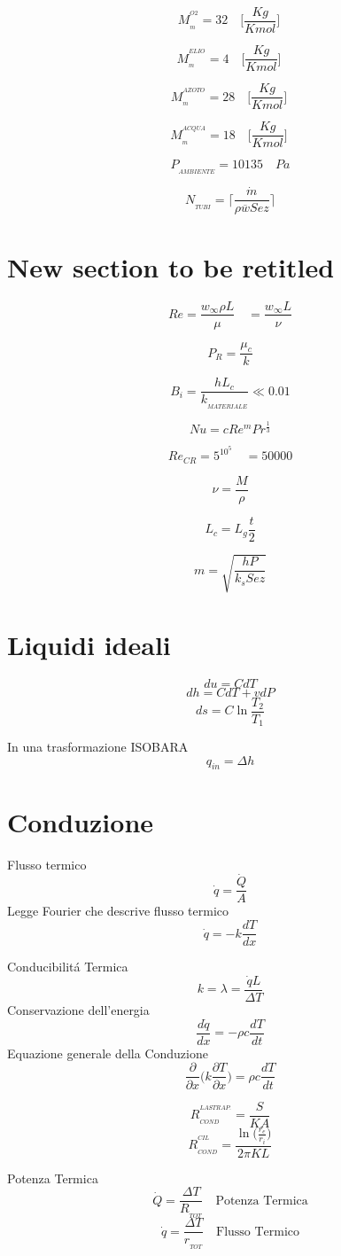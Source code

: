 \documentclass[10pt,portrait,a4paper]{article}
\begin{document}
\begin{multicols}{2}
\[ M_{_{m}}^{^{O2}} = 32 \quad \Big [ \frac {Kg}{Kmol} \Big ] \ \]

\[ M_{_{m}}^{^{ELIO}} = 4 \quad \Big [ \frac {Kg}{Kmol} \Big ] \ \]

\[ M_{_{m}}^{^{AZOTO}} = 28 \quad \Big [ \frac {Kg}{Kmol} \Big ] \ \]

\[ M_{_{m}}^{^{ACQUA}} = 18 \quad \Big [ \frac {Kg}{Kmol} \Big ] \ \]

\[ P_{_{AMBIENTE}} = 10135  \quad Pa \]

\[ N_{_{TUBI}} = \Bigg \lceil \frac {\dot m}{\rho \overline w Sez} \Bigg \rceil \]


\section{New section to be retitled}

\[ Re = \frac {w_{\infty} \rho L}{\mu} \quad   = \frac{w_{\infty} L}{\nu} \]

\[ P_{R} = \frac {\mu_{c}}{k} \]




\[ B_{i} = \frac {hL_{c}}{k_{_{MATERIALE}}} \ll 0.01\]


\[ Nu = cRe^{m} Pr^{\frac {1}{3}} \]

\[ Re_{CR} = 5^{10^{5}} \quad =50000 \]



\[\nu = \frac {M}{\rho} \]

\[L_{c} = L_{g} \frac {t}{2} \]

\[ m = \sqrt{
	\frac{hP}{k_s Sez}
}
\]



\section{Liquidi ideali}
\[
	du = CdT
	\]
\[
	dh = CdT + vdP
	\]
\[
	ds = C\ln\frac{T_2}{T_1}
	\]

	In una trasformazione ISOBARA
\[
	q_{in} = \Delta h
	\]	

\section{Conduzione}
Flusso termico
\[
	\dot{q} = \frac{\dot{Q}}{A}
	\]
Legge Fourier che descrive flusso termico
\[
	\dot{q} = -k\frac{dT}{dx}
	\]

	Conducibilitá Termica
	\[ k = \lambda = \frac{\dot{q}L}{\Delta T}\]
Conservazione dell'energia
\[
	\frac{d\dot{q}}{dx}=-\rho c\frac{dT}{dt}
	\]
Equazione generale della Conduzione
\[\frac{\partial}{\partial x}\bigg( k\frac{\partial T}{\partial x} \bigg) = \rho c \frac{dT}{dt}
\]

\[ R_{_{COND}}^{^{LASTRA P.}} =\frac{S}{KA}\]
\[ R_{_{COND}}^{^{CIL}} = \frac {\ln \Big ( \frac {r_{e}}{r_{i}} \Big )} {2 \pi KL} \]


Potenza Termica
\[ \dot{Q} =\frac{\Delta T}{R_{_{TOT}}}  \quad \textrm{Potenza Termica} \]
\[ \dot{q} =\frac{\Delta T}{r_{_{TOT}}}  \quad \textrm{Flusso Termico} \]

\end{multicols}
\end{document}
